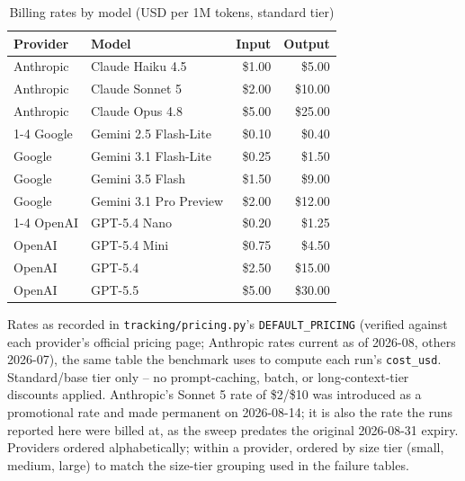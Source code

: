 \begin{table}[htbp]
  \centering
  \caption{Billing rates by model (USD per 1M tokens, standard tier)}
  \label{tab:cost-rates}
  \begin{tabular}{llrr}
    \toprule
    Provider & Model & Input & Output \\
    \midrule
    Anthropic & Claude Haiku 4.5   & \$1.00 & \$5.00  \\
    Anthropic & Claude Sonnet 5    & \$2.00 & \$10.00 \\
    Anthropic & Claude Opus 4.8    & \$5.00 & \$25.00 \\
    \cmidrule(lr){1-4}
    Google & Gemini 2.5 Flash-Lite & \$0.10 & \$0.40  \\
    Google & Gemini 3.1 Flash-Lite & \$0.25 & \$1.50  \\
    Google & Gemini 3.5 Flash      & \$1.50 & \$9.00  \\
    Google & Gemini 3.1 Pro Preview & \$2.00 & \$12.00 \\
    \cmidrule(lr){1-4}
    OpenAI & GPT-5.4 Nano  & \$0.20 & \$1.25  \\
    OpenAI & GPT-5.4 Mini  & \$0.75 & \$4.50  \\
    OpenAI & GPT-5.4       & \$2.50 & \$15.00 \\
    OpenAI & GPT-5.5       & \$5.00 & \$30.00 \\
    \bottomrule
  \end{tabular}
  \par\smallskip
  \footnotesize Rates as recorded in \texttt{tracking/pricing.py}'s \texttt{DEFAULT\_PRICING} (verified against each provider's official pricing page; Anthropic rates current as of 2026-08, others 2026-07), the same table the benchmark uses to compute each run's \texttt{cost\_usd}. Standard/base tier only -- no prompt-caching, batch, or long-context-tier discounts applied. Anthropic's Sonnet 5 rate of \$2/\$10 was introduced as a promotional rate and made permanent on 2026-08-14; it is also the rate the runs reported here were billed at, as the sweep predates the original 2026-08-31 expiry. Providers ordered alphabetically; within a provider, ordered by size tier (small, medium, large) to match the size-tier grouping used in the failure tables.
\end{table}

